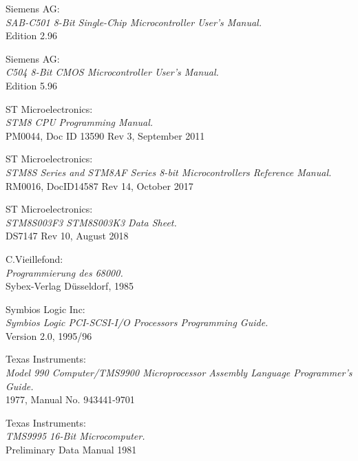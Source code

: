  Siemens AG: \\
                  {\em SAB-C501 8-Bit Single-Chip Microcontroller User's
                   Manual.\/} \\
                  Edition 2.96

 Siemens AG: \\
                  {\em C504 8-Bit CMOS Microcontroller User's Manual.\/} \\
                  Edition 5.96

 ST Microelectronics: \\
                  {\em STM8 CPU Programming Manual.\/} \\
                  PM0044, Doc ID 13590 Rev 3, September 2011

 ST Microelectronics: \\
                  {\em STM8S Series and STM8AF Series 8-bit Microcontrollers Reference Manual.\/} \\
                  RM0016, DocID14587 Rev 14, October 2017

 ST Microelectronics: \\
                  {\em STM8S003F3 STM8S003K3 Data Sheet.\/} \\
                  DS7147 Rev 10, August 2018

 C.Vieillefond: \\
                 {\em Programmierung des 68000.\/} \\
                 Sybex-Verlag D\"usseldorf, 1985

 Symbios Logic Inc: \\
                 {\em Symbios Logic PCI-SCSI-I/O Processors Programming   
                 Guide.\/} \\
                 Version 2.0, 1995/96
                 
  Texas Instruments: \\
                 {\em Model 990 Computer/TMS9900 Microprocessor
                      Assembly Language Programmer's Guide.\/} \\
                 1977, Manual No. 943441-9701

 Texas Instruments: \\
                 {\em TMS9995 16-Bit Microcomputer.\/} \\
                 Preliminary Data Manual
                 1981

